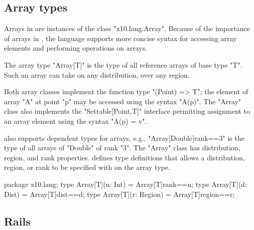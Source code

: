 \subsection{Array types}
\label{ArrayTypeConstructors}

Arrays in \Xten{} are instances of the class
\xcd"x10.lang.Array".
Because of the importance of arrays in \Xten{}, the language
supports more concise syntax for accessing array elements and
performing operations on arrays.


The array type \xcd"Array[T]" is the type of all
reference arrays of base type \xcd"T". Such an array can take on any
distribution, over any region. 


Both array classes implement the function type
\xcd"(Point) => T"; the element of array \xcd"A" at point
\xcd"p" may be accessed using the 
syntax \xcd"A(p)".  The \xcd"Array" class 
also implements the \xcd"Settable[Point,T]" interface 
permitting assignment to an array element using the syntax
\xcd"A(p) = v".

\Xten{} also supports dependent types for arrays,
e.g.,
\xcd"Array[Double]{rank==3}" is the type of all arrays of 
\xcd"Double" of rank \xcd"3".
The \xcd"Array" class has distribution, region, and rank
properties. 
\XtenCurrVer{} defines type definitions that
allows a distribution, region, or rank to be specified 
with on the array type.

\begin{xten}
package x10.lang;
type Array[T](n: Int) = Array[T]{rank==n};
type Array[T](d: Dist) = Array[T]{dist==d};
type Array[T](r: Region) = Array[T]{region==r};
\end{xten}

\subsection{Rails}

